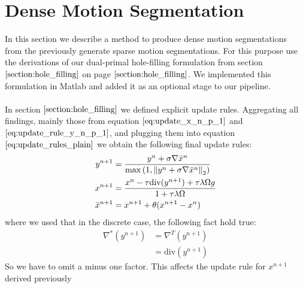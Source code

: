 \section{Dense Motion Segmentation}
In this section we describe a method to produce dense motion segmentations from the previously generate sparse motion segmentations. For this purpose use the derivations of our dual-primal hole-filling formulation from section $\ref{section:hole_filling}$ on page $\pageref{section:hole_filling}$. We implemented this formulation in Matlab and added it as an optional stage to our pipeline. \\ \\
In section $\ref{section:hole_filling}$ we defined explicit update rules. Aggregating all findings, mainly those from equation $\ref{eq:update_x_n_p_1}$ and $\ref{eq:update_rule_y_n_p_1}$, and plugging them into equation $\ref{eq:update_rules_plain}$ we obtain the following final update rules:
\begin{align}
	y^{n+1} &= \frac{y^n + \sigma \nabla \bar{x}^{n}}{\max{\left(1,\left\lVert y^n + \sigma \nabla \bar{x}^{n}\right\rVert_2 \right)}} \nonumber \\
	x^{n+1} &= \frac{x^n - \tau \text{div}(y^{n+1}) +  \tau \lambda \Omega g}{1+\tau \lambda \Omega} \\
	\bar{x}^{n+1} &= x^{n+1} + \theta(x^{n+1} - x^n)
\label{eq:final_update_rules_plain}	
\end{align}
where we used that in the discrete case, the following fact hold true:
\begin{align}
	\nabla^* (y^{n+1}) 
	&= \nabla^{T} (y^{n+1}) \nonumber \\
	&= \text{div}(y^{n+1})
\end{align}
So we have to omit a minus one factor. This affects the update rule for $x^{n+1}$ derived previously

